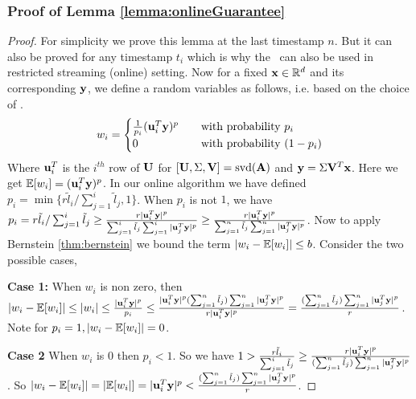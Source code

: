 \subsubsection{Proof of Lemma \ref{lemma:onlineGuarantee}}
\begin{proof}{\label{proof:onlineGuarantee}}
 For simplicity we prove this lemma at the last timestamp $n$. But it can also be proved for any timestamp $t_{i}$ which is why the \online~can also be used in restricted streaming (online) setting.
 Now for a fixed $\*x \in \~R^{d}$ and its corresponding $\*y$, we define a random variables as follows, i.e. based on the choice of \online.
 \[ w_{i} =
  \begin{cases}
    \frac{1}{p_{i}}(\*u_{i}^{T}\*y)^{p}  & \quad \text{with probability } p_{i}\\
    0 & \quad \text{with probability } (1-p_{i})
  \end{cases}
\]
Where $\*u_{i}^{T}$ is the $i^{th}$ row of $\*U$ for $[\*U,\Sigma,\*V] = \mbox{svd}(\*A)$ and $\*y = \Sigma\*V^{T}\*x$. Here we get $\~E[w_{i}] = (\*u_{i}^{T}\*y)^{p}$. In our online algorithm we have defined $p_{i} = \min\{r\tilde{l}_{i}/\sum_{j=1}^{i}\tilde{l}_{j},1\}$. When $p_{i}$ is not $1$, we have $p_{i}= r\tilde{l}_{i}/\sum_{j=1}^{i}\tilde{l}_{j}\geq \frac{r|\*u_{i}^{T}\*y|^{p}}{\sum_{j=1}^{i}\tilde{l}_{j}\sum_{j=1}^{i}|\*u_{j}^{T}\*y|^{p}}\geq \frac{r|\*u_{i}^{T}\*y|^{p}}{\sum_{j=1}^{n}\tilde{l}_{j}\sum_{j=1}^{n}|\*u_{j}^{T}\*y|^{p}}$. Now to apply Bernstein \ref{thm:bernstein} we bound the term $\vert w_{i} - \~E[w_{i}]\vert \leq b$. Consider the two possible cases,
 
 \textbf{Case 1:} When $w_{i}$ is non zero, then $|w_{i} - \~E[w_{i}]| \leq |w_{i}| \leq \frac{|\*u_{i}^{T}\*y|^{p}}{p_{i}} \leq \frac{|\*u_{i}^{T}\*y|^{p}(\sum_{j=1}^{n} \tilde{l}_{j})\sum_{j=1}^{n} |\*u_{j}^{T}\*y|^{p}}{r|\*u_{i}^{T}\*y|^{p}} = \frac{(\sum_{j=1}^{n} \tilde{l}_{j})\sum_{j=1}^{n} |\*u_{j}^{T}\*y|^{p}}{r}$. Note for $p_{i}=1, \vert w_{i} - \~E[w_{i}]\vert = 0$.
 
 \textbf{Case 2} When $w_{i}$ is $0$ then $p_{i} < 1$. So we have $1 > \frac{r\tilde{l}_{i}}{\sum_{j=1}^{i}\tilde{l}_{j}} \geq \frac{r|\*u_{i}^{T}\*y|^{p}}{(\sum_{j=1}^{n} \tilde{l}_{j})\sum_{j=1}^{n}|\*u_{j}^{T}\*y|^{p}}$. So $\vert w_{i}-\~E[w_{i}]\vert = |\~E[w_{i}|] = |\*u_{i}^{T}\*y|^{p} < \frac{(\sum_{j=1}^{n} \tilde{l}_{j})\sum_{j=1}^{n} |\*u_{j}^{T}\*y|^{p}}{r}$. 
 

\end{proof}
